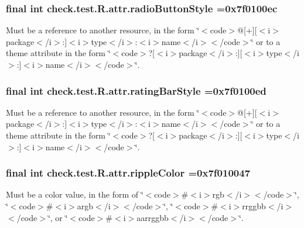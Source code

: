 \subsubsection[{radio\+Button\+Style}]{\setlength{\rightskip}{0pt plus 5cm}final int check.\+test.\+R.\+attr.\+radio\+Button\+Style =0x7f0100ec\hspace{0.3cm}{\ttfamily [static]}}\label{classcheck_1_1test_1_1_r_1_1attr_a9fbb336c43ad1f66e9f652efbc698b91}
Must be a reference to another resource, in the form \char`\"{}$<$code$>$@\mbox{[}+\mbox{]}\mbox{[}$<$i$>$package$<$/i$>$\+:\mbox{]}$<$i$>$type$<$/i$>$\+:$<$i$>$name$<$/i$>$$<$/code$>$\char`\"{} or to a theme attribute in the form \char`\"{}$<$code$>$?\mbox{[}$<$i$>$package$<$/i$>$\+:\mbox{]}\mbox{[}$<$i$>$type$<$/i$>$\+:\mbox{]}$<$i$>$name$<$/i$>$$<$/code$>$\char`\"{}. \hypertarget{classcheck_1_1test_1_1_r_1_1attr_a3caadf9d3a45df85bdd838e0a04dd32e}{}
\subsubsection[{rating\+Bar\+Style}]{\setlength{\rightskip}{0pt plus 5cm}final int check.\+test.\+R.\+attr.\+rating\+Bar\+Style =0x7f0100ed\hspace{0.3cm}{\ttfamily [static]}}\label{classcheck_1_1test_1_1_r_1_1attr_a3caadf9d3a45df85bdd838e0a04dd32e}
Must be a reference to another resource, in the form \char`\"{}$<$code$>$@\mbox{[}+\mbox{]}\mbox{[}$<$i$>$package$<$/i$>$\+:\mbox{]}$<$i$>$type$<$/i$>$\+:$<$i$>$name$<$/i$>$$<$/code$>$\char`\"{} or to a theme attribute in the form \char`\"{}$<$code$>$?\mbox{[}$<$i$>$package$<$/i$>$\+:\mbox{]}\mbox{[}$<$i$>$type$<$/i$>$\+:\mbox{]}$<$i$>$name$<$/i$>$$<$/code$>$\char`\"{}. \hypertarget{classcheck_1_1test_1_1_r_1_1attr_aa48f9eb1277fc76c78ea6941a54f37f2}{}
\subsubsection[{ripple\+Color}]{\setlength{\rightskip}{0pt plus 5cm}final int check.\+test.\+R.\+attr.\+ripple\+Color =0x7f010047\hspace{0.3cm}{\ttfamily [static]}}\label{classcheck_1_1test_1_1_r_1_1attr_aa48f9eb1277fc76c78ea6941a54f37f2}
Must be a color value, in the form of \char`\"{}$<$code$>$\#$<$i$>$rgb$<$/i$>$$<$/code$>$\char`\"{}, \char`\"{}$<$code$>$\#$<$i$>$argb$<$/i$>$$<$/code$>$\char`\"{}, \char`\"{}$<$code$>$\#$<$i$>$rrggbb$<$/i$>$$<$/code$>$\char`\"{}, or \char`\"{}$<$code$>$\#$<$i$>$aarrggbb$<$/i$>$$<$/code$>$\char`\"{}. 

